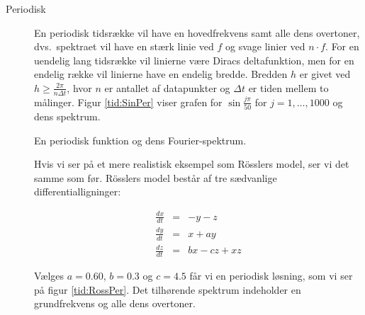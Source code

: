 \begin{description}
  \item[Periodisk] En periodisk tidsr{\ae}kke vil have en
  hovedfrekvens samt alle dens overtoner, dvs.\ spektraet
  vil have en st{\ae}rk linie ved $f$ og svage linier ved
  $n\cdot f$. For en uendelig lang tidsr{\ae}kke vil
  linierne v{\ae}re Diracs deltafunktion, men for en
  endelig r{\ae}kke vil linierne have en endelig bredde.
  Bredden $h$ er givet ved $h\ge \frac{2\pi}{n\Delta t}$,
  hvor $n$ er antallet af datapunkter og $\Delta t$ er
  tiden mellem to m{\aa}linger. Figur \ref{tid:SinPer}
  viser grafen for $\sin \frac{j\pi}{50}$ for $j =
  1,\ldots, 1000$ og dens spektrum.


    {
    \caption{\protect\capsize
             En periodisk funktion og dens Fourier-spektrum.}
    \protect\label{tid:SinPer}
    }

  Hvis vi ser p{\aa} et mere realistisk eksempel som
  R\"{o}sslers model, ser vi det samme som f{\o}r. R\"{o}sslers 
  model best{\aa}r af tre
  s{\ae}dvanlige differentialligninger:

    \begin{eqnarray*}
      \frac{dx}{dt} &=& -y-z \\
      \frac{dy}{dt} &=& x+ay \\
      \frac{dz}{dt} &=& bx-cz+xz
    \end{eqnarray*}

  V{\ae}lges $a=0.60$, $b=0.3$ og $c=4.5$ f{\aa}r vi en
  periodisk l{\o}sning, som vi ser p{\aa} figur
  \ref{tid:RossPer}. Det tilh{\o}rende spektrum indeholder
  en grundfrekvens og alle dens overtoner.


\end{description}
